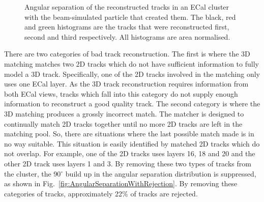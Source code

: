 \begin{figure}%
  \centering
  \caption{Angular separation of the reconstructed tracks in an ECal cluster with the beam-simulated particle that created them.  The black, red and green histograms are the tracks that were reconstructed first, second and third respectively.  All histograms are area normalised.}
  \label{fig:TrackRejectionAngularSeparation}
\end{figure}
There are two categories of bad track reconstruction.  The first is where the 3D matching matches two 2D tracks which do not have sufficient information to fully model a 3D track.  Specifically, one of the 2D tracks involved in the matching only uses one ECal layer.  As the 3D track reconstruction requires information from both ECal views, tracks which fall into this category do not supply enough information to reconstruct a good quality track.  The second category is where the 3D matching produces a grossly incorrect match.  The matcher is designed to continually match 2D tracks together until no more 2D tracks are left in the matching pool.  So, there are situations where the last possible match made is in no way suitable.  This situation is easily identified by matched 2D tracks which do not overlap.  For example, one of the 2D tracks uses layers 16, 18 and 20 and the other 2D track uses layers 1 and 3.  By removing these two types of tracks from the cluster, the 90$^\circ$ build up in the angular separation distribution is suppressed, as shown in Fig.~\ref{fig:AngularSeparationWithRejection}.  By removing these categories of tracks, approximately 22$\%$ of tracks are rejected.
